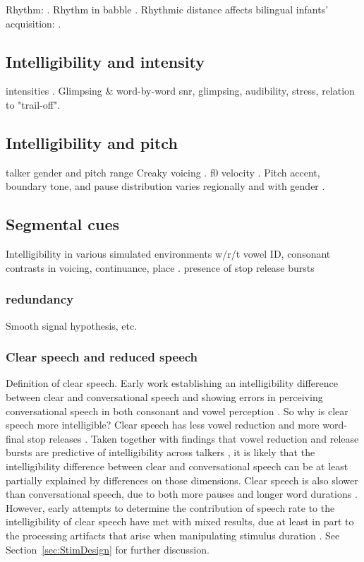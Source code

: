 Rhythm: \citep{TilsenJohnson2008}.  
Rhythm in babble \citep{CushingDellwo2010}.  
Rhythmic distance affects bilingual infants’ acquisition: \citep{SundaraScutellaro2011}.


\subsection{Intelligibility and intensity}
intensities \citep{BondMoore1994}.  Glimpsing \& word-by-word \ac{snr}, glimpsing, audibility, stress, relation to "trail-off".  
 

\subsection{Intelligibility and pitch}
talker gender and pitch range \citep{BradlowEtAl1996}
Creaky voicing  \citep{xxx}.  
f0 velocity \citep{GauthierEtAl2007b, GauthierEtAl2007a, GauthierEtAl2009}.  
Pitch accent, boundary tone, and pause distribution varies regionally and with gender \citep{ClopperSmiljanic2011}.

\subsection{Segmental cues}
Intelligibility in various simulated environments w/r/t vowel ID, consonant contrasts in voicing, continuance, place \citep{CoxEtAl1987}.  
presence of stop release bursts \citep{PichenyEtAl1986, LiLoizou2008}

\subsubsection{redundancy}
Smooth signal hypothesis, etc.

\subsubsection{Clear speech and reduced speech}
Definition of clear speech.  
Early work establishing an intelligibility difference between clear and conversational speech and showing errors in perceiving conversational speech in both consonant and vowel perception \citep{PichenyEtAl1985}.  So why is clear speech more intelligible?  Clear speech has less vowel reduction and more word-final stop releases \citep{PichenyEtAl1986}.  Taken together with findings that vowel reduction and release bursts are predictive of intelligibility across talkers \citep{xxx,LiLoizou2008}, it is likely that the intelligibility difference between clear and conversational speech can be at least partially explained by differences on those dimensions.  Clear speech is also slower than conversational speech, due to both more pauses and longer word durations \citep{PichenyEtAl1986}.  However, early attempts to determine the contribution of speech rate to the intelligibility of clear speech have met with mixed results, due at least in part to the processing artifacts that arise when manipulating stimulus duration \citep{PichenyEtAl1989, UchanskiEtAl1996, LiuZeng2006}.  See Section~\ref{sec:StimDesign} for further discussion.

